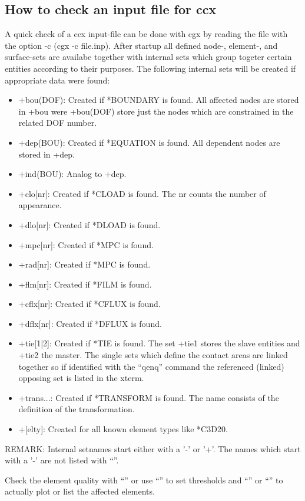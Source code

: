 \documentclass{article}
\begin{document}
\begin{appendix}
\subsection{\label{How to check an input file for ccx}How to check an input file for ccx}
A quick check of a ccx input-file can be done with cgx by reading the file with the option -c (cgx -c file.inp). After startup all defined node-, element-, and surface-sets are availabe together with internal sets which group togeter certain entities according to their purposes. The following internal sets will be created if appropriate data were found: 
\begin{itemize}
\item +bou(DOF):  Created if *BOUNDARY is found. All affected nodes are stored in +bou were +bou(DOF) store just the nodes which are constrained in the related DOF number.
\item +dep(BOU):  Created if *EQUATION is found. All dependent nodes are stored in +dep.
\item +ind(BOU):  Analog to +dep.
\item +clo[nr]:   Created if *CLOAD is found. The nr counts the number of appearance.
\item +dlo[nr]:   Created if *DLOAD is found.
\item +mpc[nr]:   Created if *MPC is found.
\item +rad[nr]:   Created if *MPC is found.
\item +flm[nr]:   Created if *FILM is found.
\item +cflx[nr]:  Created if *CFLUX is found.
\item +dflx[nr]:  Created if *DFLUX is found.
\item +tie[1|2]:  Created if *TIE is found. The set +tie1 stores the slave entities and +tie2 the master. The single sets which define the contact areas are linked together so if identified with the ``qenq'' command the referenced (linked) opposing set is listed in the xterm.
\item +trans...:  Created if *TRANSFORM is found. The name consists of the definition of the transformation.
\item +[elty]:    Created for all known element types like *C3D20.
\end{itemize}
REMARK: Internal setnames start either with a '-' or '+'. The names which start with a '-' are not listed with ``''. 

Check the element quality with ``'' or use ``'' to set thresholds and
``'' or ``'' to actually plot or list the affected elements.


\end{appendix}
\end{document}

